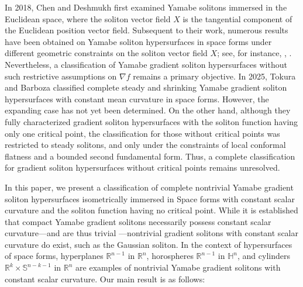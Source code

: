 \documentclass[11pt]{amsart}
\numberwithin{equation}{section}
\begin{document}
    In 2018, Chen and Deshmukh \cite{chendeshmukh} first examined Yamabe solitons immersed in the Euclidean space, where the soliton vector field $X$ is the tangential component of the Euclidean position vector field. Subsequent to their work, numerous results have been obtained on Yamabe soliton hypersurfaces in space forms under different geometric constraints on the soliton vector field $X$; see, for instance, \cite{sekomaeta}, \cite{fujiimaeta}. Nevertheless, a classification of Yamabe gradient soliton hypersurfaces without such restrictive assumptions on $\nabla f$ remains a primary objective. In 2025, Tokura and Barboza \cite{tokurabarboza} classified complete steady and shrinking Yamabe gradient soliton hypersurfaces with constant mean curvature in space forms. However, the expanding case has not yet been determined. On the other hand, although they fully characterized gradient soliton hypersurfaces with the soliton function having only one critical point, the classification for those without critical points was restricted to steady solitons, and only under the constraints of local conformal flatness and a bounded second fundamental form. Thus, a complete classification for gradient soliton hypersurfaces without critical points remains unresolved.

    
    In this paper, we present a classification of complete nontrivial Yamabe gradient soliton hypersurfaces isometrically immersed in Space forms with constant scalar curvature and the soliton function having no critical point. While it is established that compact Yamabe gradient solitons necessarily possess constant scalar curvature—and are thus trivial \cite{di} \cite{hsu}—nontrivial gradient solitons with constant scalar curvature do exist, such as the Gaussian soliton. In the context of hypersurfaces of space forms, hyperplanes $\mathbb{R}^{n-1}$ in $\mathbb{R}^n$, horospheres $\mathbb{R}^{n-1}$ in $\mathbb{H}^n$, and cylinders $\mathbb{R}^k\times \mathbb{S}^{n-k-1}$ in $\mathbb{R}^n$ are examples of nontrivial Yamabe gradient solitons with constant scalar curvature. Our main result is as follows:
\end{document}
